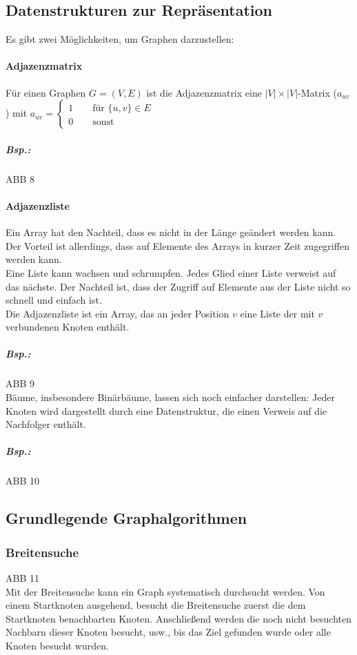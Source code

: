 \subsection{Datenstrukturen zur Repräsentation}
Es gibt zwei Möglichkeiten, um Graphen darzustellen:
\paragraph{Adjazenzmatrix}
Für einen Graphen $G=(V,E)$ ist die Adjazenzmatrix eine $|V|\times |V|$-Matrix ($a_{uv}$) mit
$a_{uv}=\begin{cases}
1 \qquad \text{für }\{u,v\}\in E\\
0 \qquad \text{sonst}
\end{cases}$
\subparagraph{Bsp.:}
ABB 8
\paragraph{Adjazenzliste} Ein Array hat den Nachteil, dass es nicht in der Länge geändert werden kann. Der Vorteil ist allerdings, dass auf Elemente des Arrays in kurzer Zeit zugegriffen werden kann.\\
Eine  Liste kann wachsen und schrumpfen. Jedes Glied einer Liste verweist auf das nächste. Der 
Nachteil ist, dass der Zugriff auf Elemente aus der Liste nicht so schnell und einfach ist.\smallskip\\
Die Adjazenzliste ist ein Array, das an jeder Position $v$ eine Liste der mit $v$ verbundenen Knoten enthält.
\subparagraph{Bsp.:} \parskp
ABB 9\medskip\\
Bäume, insbesondere Binärbäume, lassen sich noch einfacher darstellen: Jeder Knoten wird dargestellt durch eine Datenstruktur, die einen Verweis auf die Nachfolger enthält.
\subparagraph{Bsp.:}
ABB 10

\subsection{Grundlegende Graphalgorithmen}

\subsubsection{Breitensuche}\parskp
ABB 11\\
Mit der Breitensuche kann ein Graph systematisch durchsucht werden. Von einem Startknoten ausgehend, besucht die Breitensuche zuerst die dem Startknoten benachbarten Knoten. Anschließend werden die noch nicht besuchten Nachbarn dieser Knoten besucht, usw., bis das Ziel gefunden wurde oder alle Knoten besucht wurden.

